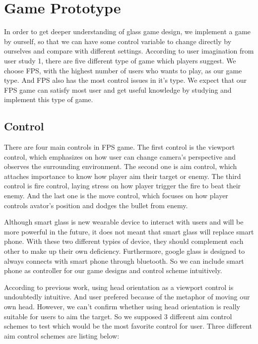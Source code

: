 \section{Game Prototype}

In order to get deeper understanding of glass game design, we implement a game by ourself, so that we can have some control variable to change directly by ourselves and compare with different settings. 
According to user imagination from user study 1, there are five different type of game which players suggest. We choose FPS, with the highest number of users who wants to play, as our game type.
And FPS also has the most control issues in it's type. 
We expect that our FPS game can satisfy most user and get  useful knowledge by studying and implement this type of game.

\subsection{Control}
There are four main controls in FPS game. 
The first control is the viewport control, which emphasizes on how user can change camera's perspective and observes the surrounding environment.
The second one is aim control, which attaches importance to  know how player aim their target or enemy. 
The third control is fire control, laying stress on how player trigger the fire to beat their enemy. 
And the last one is the move control, which focuses on how  player controls avator's position and dodges the bullet from enemy.

Although smart glass is new wearable device to interact with users and will be more powerful in the future, it does not meant that smart glass will replace smart phone\cite{lecture}. 
With these two different typies of device, they should complement each other to make up their own deficiency.
Furthermore, google glass is designed to always connects with smart phone through bluetooth. So we can include smart phone as controller for our game designs and control scheme intuitively.

According to previous work\cite{headvideo,tele,robot,viewport}, using head orientation as a viewport control is undoubtedly intuitive. And user prefered because of the metaphor of moving our own head. However, we can't confirm whether using head orientation is really suitable for users to aim the target. 
So we supposed 3 different aim control schemes to test which would be the most favorite control for user. 
Three different aim control schemes are listing below:

